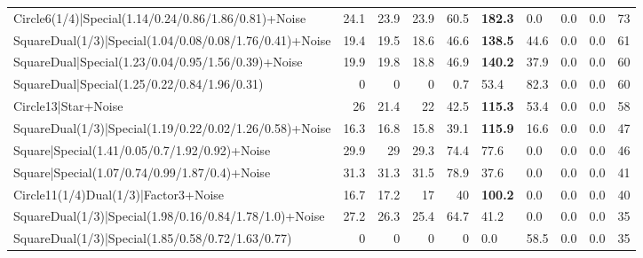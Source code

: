 \begin{tabular}{lrrrrllllr}
 Circle6(1/4)|Special(1.14/0.24/0.86/1.86/0.81)+Noise    &         24.1 &         23.9 &         23.9 &            60.5 & \textbf{182.3} & 0.0            & 0.0            & 0.0             &           73 \\
 SquareDual(1/3)|Special(1.04/0.08/0.08/1.76/0.41)+Noise &         19.4 &         19.5 &         18.6 &            46.6 & \textbf{138.5} & 44.6           & 0.0            & 0.0             &           61 \\
 SquareDual|Special(1.23/0.04/0.95/1.56/0.39)+Noise      &         19.9 &         19.8 &         18.8 &            46.9 & \textbf{140.2} & 37.9           & 0.0            & 0.0             &           60 \\
 SquareDual|Special(1.25/0.22/0.84/1.96/0.31)            &          0   &          0   &          0   &             0.7 & 53.4           & 82.3           & 0.0            & 0.0             &           60 \\
 Circle13|Star+Noise                                     &         26   &         21.4 &         22   &            42.5 & \textbf{115.3} & 53.4           & 0.0            & 0.0             &           58 \\
 SquareDual(1/3)|Special(1.19/0.22/0.02/1.26/0.58)+Noise &         16.3 &         16.8 &         15.8 &            39.1 & \textbf{115.9} & 16.6           & 0.0            & 0.0             &           47 \\
 Square|Special(1.41/0.05/0.7/1.92/0.92)+Noise           &         29.9 &         29   &         29.3 &            74.4 & 77.6           & 0.0            & 0.0            & 0.0             &           46 \\
 Square|Special(1.07/0.74/0.99/1.87/0.4)+Noise           &         31.3 &         31.3 &         31.5 &            78.9 & 37.6           & 0.0            & 0.0            & 0.0             &           41 \\
 Circle11(1/4)Dual(1/3)|Factor3+Noise                    &         16.7 &         17.2 &         17   &            40   & \textbf{100.2} & 0.0            & 0.0            & 0.0             &           40 \\
 SquareDual(1/3)|Special(1.98/0.16/0.84/1.78/1.0)+Noise  &         27.2 &         26.3 &         25.4 &            64.7 & 41.2           & 0.0            & 0.0            & 0.0             &           35 \\
 SquareDual(1/3)|Special(1.85/0.58/0.72/1.63/0.77)       &          0   &          0   &          0   &             0   & 0.0            & 58.5           & 0.0            & 0.0             &           35 \\

\end{tabular}
